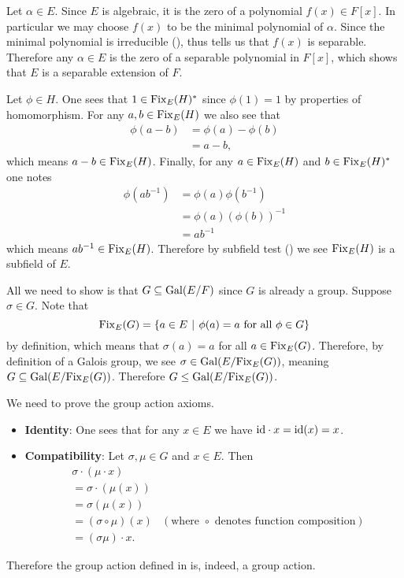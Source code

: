 \begin{questions}
    \item Let $\alpha \in E$. Since $E$ is algebraic, it is the zero of a polynomial $f(x) \in F[x]$. In particular we may choose $f(x)$ to be the minimal polynomial of $\alpha$. Since the minimal polynomial is irreducible (), thus  tells us that $f(x)$ is separable. Therefore any $\alpha \in E$ is the zero of a separable polynomial in $F[x]$, which shows that $E$ is a separable extension of $F$.

    \item Let $\phi \in H$. One sees that $1 \in \mathrm{Fix}_{E}(H)^\ast$ since $\phi(1) = 1$ by properties of homomorphism. For any $a, b \in \mathrm{Fix}_{E}(H)$ we also see that
    \begin{align*}
        \phi(a - b) &= \phi(a) - \phi(b)\\
        &= a - b,
    \end{align*}
    which means $a - b \in \mathrm{Fix}_{E}(H)$. Finally, for any $a \in \mathrm{Fix}_{E}(H)$ and $b \in \mathrm{Fix}_{E}(H)^\ast$ one notes
    \begin{align*}
        \phi(ab^{-1}) &= \phi(a)\phi(b^{-1})\\
        &= \phi(a)\left(\phi(b)\right)^{-1}\\
        &= ab^{-1}
    \end{align*}
    which means $ab^{-1} \in \mathrm{Fix}_{E}(H)$. Therefore by subfield test () we see $\mathrm{Fix}_{E}(H)$ is a subfield of $E$.

    \item All we need to show is that $G \subseteq \mathrm{Gal}(E/F)$ since $G$ is already a group. Suppose $\sigma \in G$. Note that
    \[
        \Fix{E}{G} = \{a \in E \vert \phi(a) = a \text{ for all } \phi \in G\}
    \]
    by definition, which means that $\sigma(a) = a$ for all $a \in \mathrm{Fix}_{E}(G)$. Therefore, by definition of a Galois group, we see $\sigma \in \mathrm{Gal}(E/\mathrm{Fix}_{E}(G))$, meaning $G \subseteq \mathrm{Gal}(E/\mathrm{Fix}_{E}(G))$. Therefore $G \leq \mathrm{Gal}(E/\mathrm{Fix}_{E}(G))$.

    \item We need to prove the group action axioms.
    \begin{itemize}
        \item \textbf{Identity}: One sees that for any $x \in E$ we have $\mathrm{id}\cdot x = \mathrm{id}(x) = x$.
        \item \textbf{Compatibility}: Let $\sigma, \mu \in G$ and $x \in E$. Then
        \begin{align*}
            &\sigma \cdot (\mu \cdot x)\\
            &= \sigma \cdot (\mu(x))\\
            &= \sigma(\mu(x))\\
            &= (\sigma\circ \mu)(x) & (\text{where } \circ \text{ denotes function composition})\\
            &= (\sigma\mu) \cdot x.
        \end{align*}
    \end{itemize}
    Therefore the group action defined in  is, indeed, a group action.


\end{questions}
